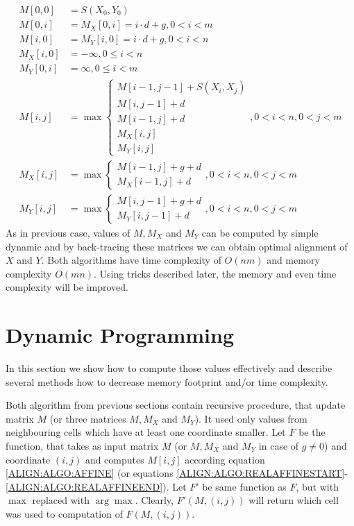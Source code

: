 \begin{align}
M[0,0] &= S(X_0,Y_0)\\
M[0,i] &= M_X[0,i] = i\cdot d+g, 0 < i < m\\
M[i,0] &= M_Y[i,0] = i\cdot d+g, 0 < i < n\\
M_X[i,0] &= -\infty, 0\leq i< n\\
M_Y[0,i] &= \infty, 0 \leq i< m\\
M[i,j] &= \max
\begin{cases}\label{ALIGN:ALGO:REALAFFINESTART}
 M[i-1,j-1]+S(X_i,X_j)\\
 M[i,j-1]+d\\
 M[i-1,j]+d\\
 M_X[i,j]\\
 M_Y[i,j]
\end{cases}, 0<i<n,0<j<m\\
M_X[i,j] &= \max
\begin{cases}
M[i-1,j]+g+d\\
M_X[i-1,j]+d
\end{cases}, 0<i<n,0<j<m\\
M_Y[i,j] &= \max
\begin{cases}
M[i,j-1]+g+d\\
M_Y[i,j-1]+d
\end{cases}, 0<i<n,0<j<m\label{ALIGN:ALGO:REALAFFINEEND}
\end{align}
As in previous case, values of $M,M_X$ and $M_Y$ can be computed by simple
dynamic and by back-tracing these matrices we can obtain optimal alignment of
$X$ and $Y$.  Both algorithms have time complexity of $O(nm)$ and memory
complexity $O(mn)$.  Using tricks described later, the memory and even time
complexity will be improved.

\section{Dynamic Programming}\label{DYNPROG}

In this section we show how to compute those values effectively and describe
several methods how to decrease memory footprint and/or time complexity. 

Both algorithm from previous sections contain recursive procedure, that update
matrix $M$ (or three matrices $M,M_X$ and $M_Y$). It used only values from
neighbouring cells which have at least one coordinate smaller. Let $F$ be the
function, that takes as input matrix $M$ (or $M, M_X$ and $M_Y$ in case of
$g\not=0$) and coordinate $(i,j)$ and computes
$M[i,j]$ according equation \ref{ALIGN:ALGO:AFFINE} (or equations
\ref{ALIGN:ALGO:REALAFFINESTART}-\ref{ALIGN:ALGO:REALAFFINEEND}).
Let $F'$ be same function as $F$, but with $\max$ replaced with $\arg\max$.
Clearly, $F'(M,(i,j))$ will return which cell was used to computation of
$F(M,(i,j))$.


